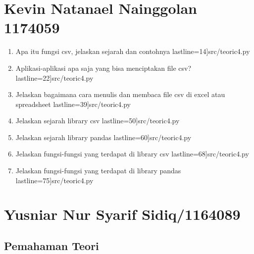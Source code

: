 \section {Kevin Natanael Nainggolan 1174059}
	\begin {enumerate}
		\item Apa itu fungsi csv, jelaskan sejarah dan contohnya 
			 lastline=14]{src/teoric4.py}
		\item Aplikasi-aplikasi apa saja yang bisa menciptakan file csv? 
			 lastline=22]{src/teoric4.py}
		\item Jelaskan bagaimana cara menulis dan membaca file csv di excel atau spreadsheet
			 lastline=39]{src/teoric4.py}
		\item Jelaskan sejarah library csv
			 lastline=50]{src/teoric4.py}
		\item Jelaskan sejarah library pandas
			 lastline=60]{src/teoric4.py}
		\item Jelaskan fungsi-fungsi yang terdapat di library csv
			 lastline=68]{src/teoric4.py}
		\item Jelaskan fungsi-fungsi yang terdapat di library pandas
			 lastline=75]{src/teoric4.py}
	\end {enumerate}

\section{Yusniar Nur Syarif Sidiq/1164089}
\subsection{Pemahaman Teori}

